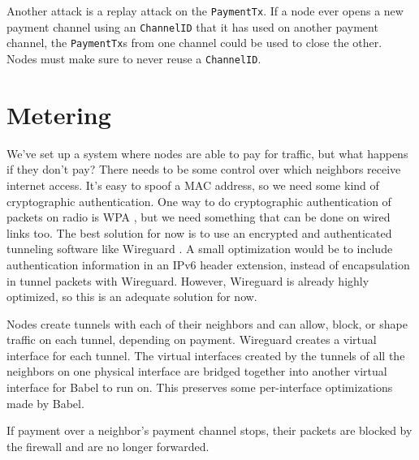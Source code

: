 \documentclass[11pt]{article}
\begin{document}
Another attack is a replay attack on the \texttt{PaymentTx}. If a node ever opens a new payment channel using an \texttt{ChannelID} that it has used on another payment channel, the \texttt{PaymentTx}s from one channel could be used to close the other. Nodes must make sure to never reuse a \texttt{ChannelID}. 

\section{Metering}
\label{sec:metering}
We’ve set up a system where nodes are able to pay for traffic, but what happens if they don’t pay? There needs to be some control over which neighbors receive internet access. It’s easy to spoof a MAC address, so we need some kind of cryptographic authentication. One way to do cryptographic authentication of packets on radio is WPA \cite{80211i}, but we need something that can be done on wired links too. The best solution for now is to use an encrypted and authenticated tunneling software like Wireguard \cite{wireguard}. A small optimization would be to include authentication information in an IPv6 header extension, instead of encapsulation in tunnel packets with Wireguard. However, Wireguard is already highly optimized, so this is an adequate solution for now.

\begin{figure}
\end{figure}

Nodes create tunnels with each of their neighbors and can allow, block, or shape traffic on each tunnel, depending on payment. Wireguard creates a virtual interface for each tunnel. The virtual interfaces created by the tunnels of all the neighbors on one physical interface are bridged together into another virtual interface for Babel to run on. This preserves some per-interface optimizations made by Babel.

If payment over a neighbor’s payment channel stops, their packets are blocked by the firewall and are no longer forwarded.
\end{document}
